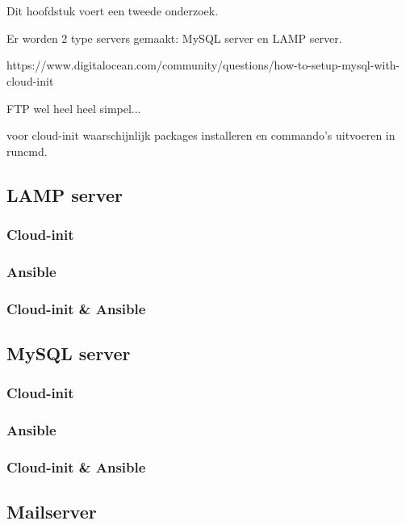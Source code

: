 \chapter{}
\label{ch:serverconf}
Dit hoofdstuk voert een tweede onderzoek.

Er worden 2 type servers gemaakt: MySQL server en LAMP server.

https://www.digitalocean.com/community/questions/how-to-setup-mysql-with-cloud-init


FTP wel heel heel simpel...

voor cloud-init waarschijnlijk packages installeren en commando's uitvoeren in runcmd.
\section{LAMP server}

\subsection{Cloud-init}

\subsection{Ansible}

\subsection{Cloud-init \& Ansible}

\section{MySQL server}

\subsection{Cloud-init}

\subsection{Ansible}

\subsection{Cloud-init \& Ansible}

\section{Mailserver}

